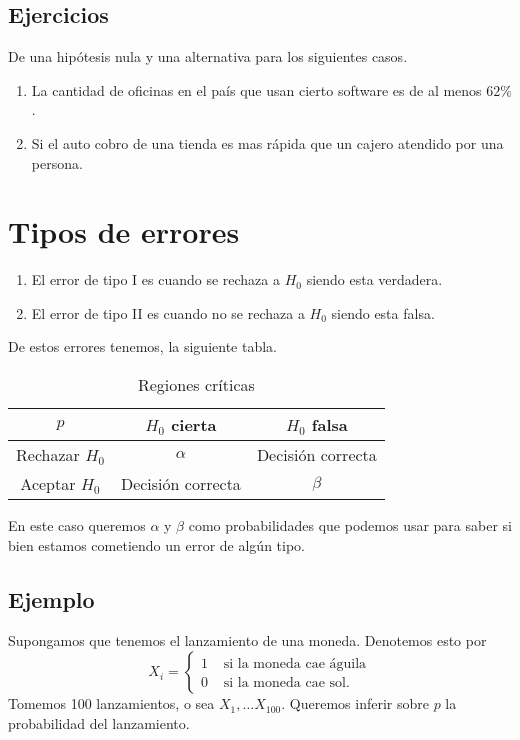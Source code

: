 \documentclass{assignment}
\begin{document}
\subsection*{Ejercicios}
De una hipótesis nula y una alternativa para los siguientes casos. 
\begin{enumerate}
	\item La cantidad de oficinas en el país que usan cierto software es de al menos $62\%$.
	\item Si el auto cobro de una tienda es mas rápida que un cajero atendido por una persona. 
\end{enumerate}

 
\section{Tipos de errores}
\begin{enumerate}
    \item El error de tipo I es cuando se rechaza a $H_0$ siendo esta verdadera.
    \item El error de tipo II es cuando no se rechaza a $H_0$ siendo esta falsa.
\end{enumerate}

De estos errores tenemos, la siguiente tabla. 

\begin{table}[h]
    \centering
    \begin{tabular}{|c|c|c|}
    \hline
    $p$  & $H_0$ cierta & $H_0$ falsa   \\
    \hline
    Rechazar $H_0$  & $\alpha$ & Decisión correcta   \\
    \hline
    Aceptar $H_0$ & Decisión correcta & $\beta$  \\
    \hline
    \end{tabular}
    \caption{Regiones críticas}
\end{table}

En este caso queremos $\alpha$ y $\beta$ como probabilidades que podemos usar para saber si bien estamos cometiendo un error de algún tipo. 

\subsection*{Ejemplo}
Supongamos que tenemos el lanzamiento de una moneda. Denotemos esto por 
\[
X_i = \begin{cases}
1 & \text{ si la moneda cae águila} \\
0 & \text{ si la moneda cae sol}.
\end{cases}
\] 
Tomemos 100 lanzamientos, o sea $X_1, \dots X_100$. Queremos inferir sobre $p$ la probabilidad del lanzamiento. 
\end{document}
